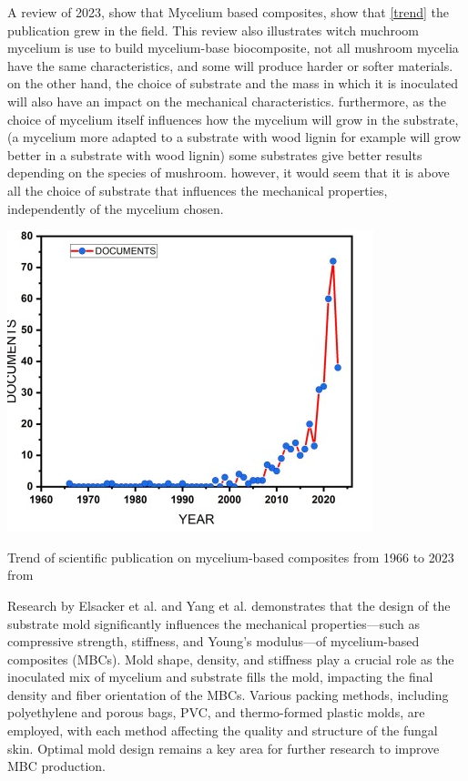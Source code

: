 A review of 2023,\cite{alaneme2023mycelium} show that Mycelium based composites, show that \ref{trend} the publication grew in the field.
This review also illustrates witch muchroom mycelium is use to build mycelium-base biocomposite, not all mushroom mycelia have the same characteristics, and some will produce harder or softer materials. on the other hand, the choice of substrate and the mass in which it is inoculated will also have an impact on the mechanical characteristics. furthermore, as the choice of mycelium itself influences how the mycelium will grow in the substrate, (a mycelium more adapted to a substrate with wood lignin for example will grow better in a substrate with wood lignin) some substrates give better results depending on the species of mushroom. 
however, it would seem that it is above all the choice of substrate that influences the mechanical properties, independently of the mycelium chosen.  

\begin{marginfigure}
    \centering
    \includegraphics{images/publication on mycelium-based.png}    
    \caption{Trend of scientific publication on mycelium-based composites from 1966 to 2023 from \cite{alaneme2023mycelium}}
    \label{fig:trend}
\end{marginfigure}

Research by Elsacker et al.\cite{elsacker2019mechanical} and Yang et al.\cite{yang2017physical} demonstrates that the design of the substrate mold significantly influences the mechanical properties—such as compressive strength, stiffness, and Young’s modulus—of mycelium-based composites (MBCs). Mold shape, density, and stiffness play a crucial role as the inoculated mix of mycelium and substrate fills the mold, impacting the final density and fiber orientation of the MBCs. Various packing methods, including polyethylene and porous bags, PVC, and thermo-formed plastic molds, are employed, with each method affecting the quality and structure of the fungal skin. Optimal mold design remains a key area for further research to improve MBC production.

